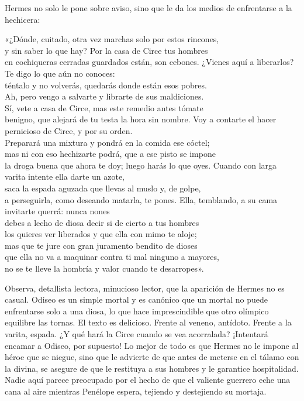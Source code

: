 Hermes no solo le pone sobre aviso, sino que le da los medios de enfrentarse a la hechicera:

\begin{versocita}
«¿Dónde, cuitado, otra vez marchas solo por estos rincones,\\
y sin saber lo que hay? Por la casa de Circe tus hombres\\
en cochiqueras cerradas guardados están, son cebones.
\stanzabreak
¿Vienes aquí a liberarlos? Te digo lo que aún no conoces:\\
téntalo y no volverás, quedarás donde están esos pobres.\\
Ah, pero vengo a salvarte y librarte de sus maldiciones.\\
Sí, vete a casa de Circe, mas este remedio antes tómate\\
benigno, que alejará de tu testa la hora sin nombre.
\stanzabreak
Voy a contarte el hacer pernicioso de Circe, y por su orden.\\
Preparará una mixtura y pondrá en la comida ese cóctel;\\
mas ni con eso hechizarte podrá, que a ese pisto se impone\\
la droga buena que ahora te doy; luego harás lo que oyes.
\stanzabreak
Cuando con larga varita intente ella darte un azote,\\
saca la espada aguzada que llevas al muslo y, de golpe,\\
a perseguirla, como deseando matarla, te pones.
\stanzabreak
Ella, temblando, a su cama invitarte querrá: nunca nones\\
debes a lecho de diosa decir si de cierto a tus hombres\\
los quieres ver liberados y que ella con mimo te aloje;\\
mas que te jure con gran juramento bendito de dioses\\
que ella no va a maquinar contra ti mal ninguno a mayores,\\
no se te lleve la hombría y valor cuando te desarropes».
\end{versocita}

Observa, detallista lectora, minucioso lector, que la aparición de Hermes no es casual. Odiseo es un simple mortal y es canónico que un mortal no puede enfrentarse solo a una diosa, lo que hace imprescindible que otro olímpico equilibre las tornas. El texto es delicioso. Frente al veneno, antídoto. Frente a la varita, espada. ¿Y qué hará la Circe cuando se vea acorralada? ¡Intentará encamar a Odiseo, por supuesto! Lo mejor de todo es que Hermes no le impone al héroe que se niegue, sino que le advierte de que antes de meterse en el tálamo con la divina, se asegure de que le restituya a sus hombres y le garantice hospitalidad. Nadie aquí parece preocupado por el hecho de que el valiente guerrero eche una cana al aire mientras Penélope espera, tejiendo y destejiendo su mortaja.

